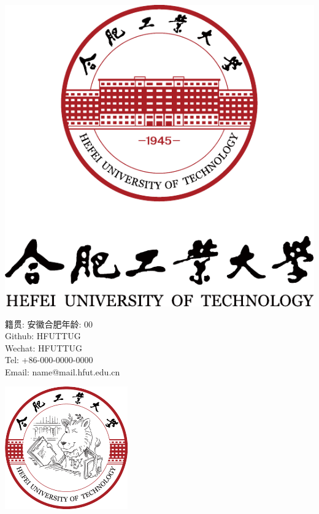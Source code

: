\documentclass{resume}
\begin{document}

\begin{minipage}[b]{0.3\linewidth}
    \includegraphics[height=8\baselineskip]{imgs/HFUT_Vertical_name&badge.pdf}
\end{minipage}
\hfill
\begin{minipage}[b]{0.3\linewidth}
    \begin{center}
        籍贯: 安徽合肥\quad 年龄: 00\\
        Github: HFUTTUG\\
        Wechat: HFUTTUG \\
        Tel: +86-000-0000-0000 \\
        Email: name@mail.hfut.edu.cn 
    \end{center}
\end{minipage}
\hfill
\begin{minipage}[b]{0.3\linewidth}
    \begin{flushright}
    \includegraphics[height=8\baselineskip]{imgs/HFUTTUG.png}
    \end{flushright}
\end{minipage}
\end{document}
